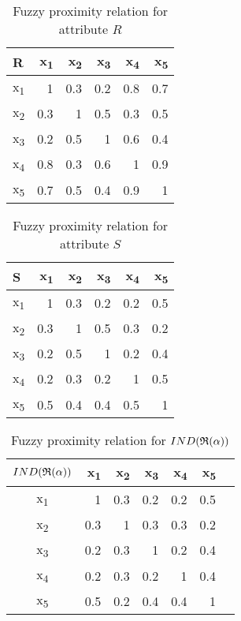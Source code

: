 \documentclass[11pt]{article}
\begin{document}
\begin{table}[htbp]
\caption{Fuzzy proximity relation for attribute \(R\)}
\centering
\begin{tabular}{lrrrrr}
\hline
R & x\textsubscript{1} & x\textsubscript{2} & x\textsubscript{3} & x\textsubscript{4} & x\textsubscript{5}\\
\hline
x\textsubscript{1} & 1 & 0.3 & 0.2 & 0.8 & 0.7\\
x\textsubscript{2} & 0.3 & 1 & 0.5 & 0.3 & 0.5\\
x\textsubscript{3} & 0.2 & 0.5 & 1 & 0.6 & 0.4\\
x\textsubscript{4} & 0.8 & 0.3 & 0.6 & 1 & 0.9\\
x\textsubscript{5} & 0.7 & 0.5 & 0.4 & 0.9 & 1\\
\hline
\end{tabular}
\end{table}

\begin{table}[htbp]
\caption{Fuzzy proximity relation for attribute \(S\)}
\centering
\begin{tabular}{lrrrrr}
\hline
S & x\textsubscript{1} & x\textsubscript{2} & x\textsubscript{3} & x\textsubscript{4} & x\textsubscript{5}\\
\hline
x\textsubscript{1} & 1 & 0.3 & 0.2 & 0.2 & 0.5\\
x\textsubscript{2} & 0.3 & 1 & 0.5 & 0.3 & 0.2\\
x\textsubscript{3} & 0.2 & 0.5 & 1 & 0.2 & 0.4\\
x\textsubscript{4} & 0.2 & 0.3 & 0.2 & 1 & 0.5\\
x\textsubscript{5} & 0.5 & 0.4 & 0.4 & 0.5 & 1\\
\hline
\end{tabular}
\end{table}

\begin{table}[htbp]
\caption{Fuzzy proximity relation for \(IND(\mathfrak{R}(\alpha))\)}
\centering
\begin{tabular}{crrrrrl}
\hline
\(IND(\mathfrak{R}(\alpha))\) & x\textsubscript{1} & x\textsubscript{2} & x\textsubscript{3} & x\textsubscript{4} & x\textsubscript{5} & \\
\hline
x\textsubscript{1} & 1 & 0.3 & 0.2 & 0.2 & 0.5 & \\
x\textsubscript{2} & 0.3 & 1 & 0.3 & 0.3 & 0.2 & \\
x\textsubscript{3} & 0.2 & 0.3 & 1 & 0.2 & 0.4 & \\
x\textsubscript{4} & 0.2 & 0.3 & 0.2 & 1 & 0.4 & \\
x\textsubscript{5} & 0.5 & 0.2 & 0.4 & 0.4 & 1 & \\
\hline
\end{tabular}
\end{table}
\end{document}

